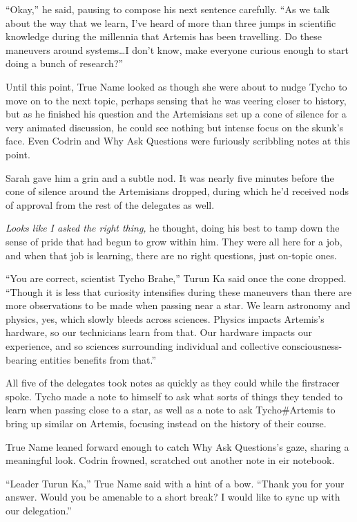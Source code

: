 ``Okay,'' he said, pausing to compose his next sentence carefully. ``As we talk about the way that we learn, I've heard of more than three jumps in scientific knowledge during the millennia that Artemis has been travelling. Do these maneuvers around systems\ldots I don't know, make everyone curious enough to start doing a bunch of research?''

Until this point, True Name looked as though she were about to nudge Tycho to move on to the next topic, perhaps sensing that he was veering closer to history, but as he finished his question and the Artemisians set up a cone of silence for a very animated discussion, he could see nothing but intense focus on the skunk's face. Even Codrin and Why Ask Questions were furiously scribbling notes at this point.

Sarah gave him a grin and a subtle nod. It was nearly five minutes before the cone of silence around the Artemisians dropped, during which he'd received nods of approval from the rest of the delegates as well.

\emph{Looks like I asked the right thing,} he thought, doing his best to tamp down the sense of pride that had begun to grow within him. They were all here for a job, and when that job is learning, there are no right questions, just on-topic ones.

``You are correct, scientist Tycho Brahe,'' Turun Ka said once the cone dropped. ``Though it is less that curiosity intensifies during these maneuvers than there are more observations to be made when passing near a star. We learn astronomy and physics, yes, which slowly bleeds across sciences. Physics impacts Artemis's hardware, so our technicians learn from that. Our hardware impacts our experience, and so sciences surrounding individual and collective consciousness-bearing entities benefits from that.''

All five of the delegates took notes as quickly as they could while the firstracer spoke. Tycho made a note to himself to ask what sorts of things they tended to learn when passing close to a star, as well as a note to ask Tycho\#Artemis to bring up similar on Artemis, focusing instead on the history of their course.

True Name leaned forward enough to catch Why Ask Questions's gaze, sharing a meaningful look. Codrin frowned, scratched out another note in eir notebook.

``Leader Turun Ka,'' True Name said with a hint of a bow. ``Thank you for your answer. Would you be amenable to a short break? I would like to sync up with our delegation.''

